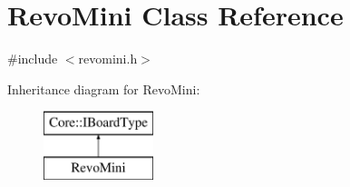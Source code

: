 \hypertarget{class_revo_mini}{\section{\-Revo\-Mini \-Class \-Reference}
\label{class_revo_mini}
}


{\ttfamily \#include $<$revomini.\-h$>$}

\-Inheritance diagram for \-Revo\-Mini\-:\begin{figure}[H]
\begin{center}
\leavevmode
\includegraphics[height=2.000000cm]{class_revo_mini}
\end{center}
\end{figure}
